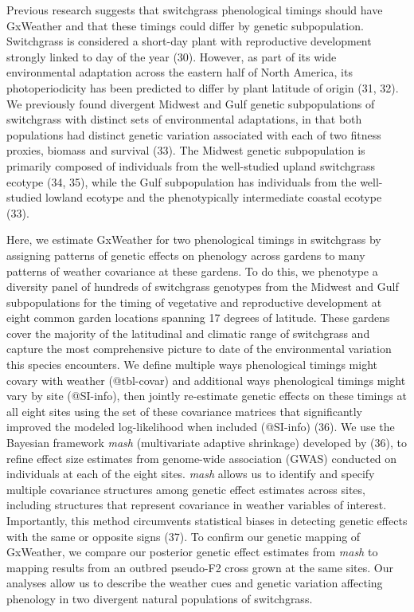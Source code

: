 \documentclass[
  9pt,
  twocolumn,
  twoside]{pnas-new}
\begin{document}
Previous research suggests that switchgrass phenological timings should
have GxWeather and that these timings could differ by genetic
subpopulation. Switchgrass is considered a short-day plant with
reproductive development strongly linked to day of the year (30).
However, as part of its wide environmental adaptation across the eastern
half of North America, its photoperiodicity has been predicted to differ
by plant latitude of origin (31, 32). We previously found divergent
Midwest and Gulf genetic subpopulations of switchgrass with distinct
sets of environmental adaptations, in that both populations had distinct
genetic variation associated with each of two fitness proxies, biomass
and survival (33). The Midwest genetic subpopulation is primarily
composed of individuals from the well-studied upland switchgrass ecotype
(34, 35), while the Gulf subpopulation has individuals from the
well-studied lowland ecotype and the phenotypically intermediate coastal
ecotype (33).

Here, we estimate GxWeather for two phenological timings in switchgrass
by assigning patterns of genetic effects on phenology across gardens to
many patterns of weather covariance at these gardens. To do this, we
phenotype a diversity panel of hundreds of switchgrass genotypes from
the Midwest and Gulf subpopulations for the timing of vegetative and
reproductive development at eight common garden locations spanning 17
degrees of latitude. These gardens cover the majority of the latitudinal
and climatic range of switchgrass and capture the most comprehensive
picture to date of the environmental variation this species encounters.
We define multiple ways phenological timings might covary with weather
(@tbl-covar) and additional ways phenological timings might vary by site
(@SI-info), then jointly re-estimate genetic effects on these timings at
all eight sites using the set of these covariance matrices that
significantly improved the modeled log-likelihood when included
(@SI-info) (36). We use the Bayesian framework \emph{mash} (multivariate
adaptive shrinkage) developed by (36), to refine effect size estimates
from genome-wide association (GWAS) conducted on individuals at each of
the eight sites. \emph{mash} allows us to identify and specify multiple
covariance structures among genetic effect estimates across sites,
including structures that represent covariance in weather variables of
interest. Importantly, this method circumvents statistical biases in
detecting genetic effects with the same or opposite signs (37). To
confirm our genetic mapping of GxWeather, we compare our posterior
genetic effect estimates from \emph{mash} to mapping results from an
outbred pseudo-F2 cross grown at the same sites. Our analyses allow us
to describe the weather cues and genetic variation affecting phenology
in two divergent natural populations of switchgrass.
\end{document}
